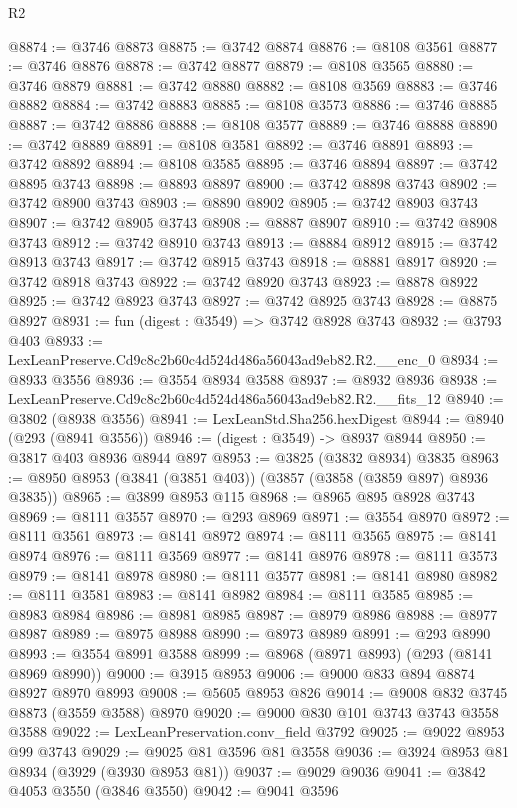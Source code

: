 \begin{lexlean}{R2}
\begin{coremodule}
@8874 := @3746 @8873
@8875 := @3742 @8874
@8876 := @8108 @3561
@8877 := @3746 @8876
@8878 := @3742 @8877
@8879 := @8108 @3565
@8880 := @3746 @8879
@8881 := @3742 @8880
@8882 := @8108 @3569
@8883 := @3746 @8882
@8884 := @3742 @8883
@8885 := @8108 @3573
@8886 := @3746 @8885
@8887 := @3742 @8886
@8888 := @8108 @3577
@8889 := @3746 @8888
@8890 := @3742 @8889
@8891 := @8108 @3581
@8892 := @3746 @8891
@8893 := @3742 @8892
@8894 := @8108 @3585
@8895 := @3746 @8894
@8897 := @3742 @8895 @3743
@8898 := @8893 @8897
@8900 := @3742 @8898 @3743
@8902 := @3742 @8900 @3743
@8903 := @8890 @8902
@8905 := @3742 @8903 @3743
@8907 := @3742 @8905 @3743
@8908 := @8887 @8907
@8910 := @3742 @8908 @3743
@8912 := @3742 @8910 @3743
@8913 := @8884 @8912
@8915 := @3742 @8913 @3743
@8917 := @3742 @8915 @3743
@8918 := @8881 @8917
@8920 := @3742 @8918 @3743
@8922 := @3742 @8920 @3743
@8923 := @8878 @8922
@8925 := @3742 @8923 @3743
@8927 := @3742 @8925 @3743
@8928 := @8875 @8927
@8931 := fun (digest : @3549) => @3742 @8928 @3743
@8932 := @3793 @403
@8933 := LexLeanPreserve.Cd9c8c2b60c4d524d486a56043ad9eb82.R2.__enc_0
@8934 := @8933 @3556
@8936 := @3554 @8934 @3588
@8937 := @8932 @8936
@8938 := LexLeanPreserve.Cd9c8c2b60c4d524d486a56043ad9eb82.R2.__fits_12
@8940 := @3802 (@8938 @3556)
@8941 := LexLeanStd.Sha256.hexDigest
@8944 := @8940 (@293 (@8941 @3556))
@8946 := (digest : @3549) -> @8937 @8944
@8950 := @3817 @403 @8936 @8944 @897
@8953 := @3825 (@3832 @8934) @3835
@8963 := @8950 @8953 (@3841 (@3851 @403)) (@3857 (@3858 (@3859 @897) @8936 @3835))
@8965 := @3899 @8953 @115
@8968 := @8965 @895 @8928 @3743
@8969 := @8111 @3557
@8970 := @293 @8969
@8971 := @3554 @8970
@8972 := @8111 @3561
@8973 := @8141 @8972
@8974 := @8111 @3565
@8975 := @8141 @8974
@8976 := @8111 @3569
@8977 := @8141 @8976
@8978 := @8111 @3573
@8979 := @8141 @8978
@8980 := @8111 @3577
@8981 := @8141 @8980
@8982 := @8111 @3581
@8983 := @8141 @8982
@8984 := @8111 @3585
@8985 := @8983 @8984
@8986 := @8981 @8985
@8987 := @8979 @8986
@8988 := @8977 @8987
@8989 := @8975 @8988
@8990 := @8973 @8989
@8991 := @293 @8990
@8993 := @3554 @8991 @3588
@8999 := @8968 (@8971 @8993) (@293 (@8141 @8969 @8990))
@9000 := @3915 @8953
@9006 := @9000 @833 @894 @8874 @8927 @8970 @8993
@9008 := @5605 @8953 @826
@9014 := @9008 @832 @3745 @8873 (@3559 @3588) @8970
@9020 := @9000 @830 @101 @3743 @3743 @3558 @3588
@9022 := LexLeanPreservation.conv_field @3792
@9025 := @9022 @8953 @99 @3743
@9029 := @9025 @81 @3596 @81 @3558
@9036 := @3924 @8953 @81 @8934 (@3929 (@3930 @8953 @81))
@9037 := @9029 @9036
@9041 := @3842 @4053 @3550 (@3846 @3550)
@9042 := @9041 @3596

\end{coremodule}
\end{lexlean}

